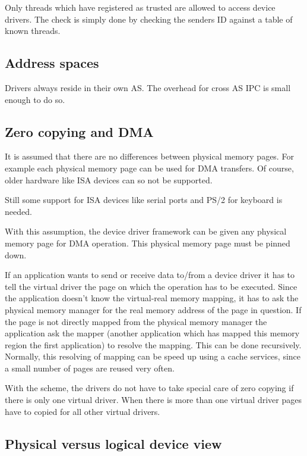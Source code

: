 Only threads which have registered as trusted are allowed to access
device drivers.  The check is simply done by checking the senders
ID against a table of known threads.

\subsection{Address spaces}

Drivers always reside in their own AS. The overhead for cross AS IPC
is small enough to do so.

\subsection{Zero copying and DMA}

It is assumed that there are no differences between physical memory
pages. For example each physical memory page can be used for DMA
transfers. Of course, older hardware like ISA devices can so not be
supported.  

Still some support for ISA devices like serial ports and PS/2 for
keyboard is needed.  
  
With this assumption, the device driver framework can be given any
physical memory page for DMA operation.  This physical memory page
must be pinned down.
  
If an application wants to send or receive data to/from a device
driver it has to tell the virtual driver the page on which the
operation has to be executed.  Since the application doesn't know
the virtual-real memory mapping, it has to ask the physical memory
manager for the real memory address of the page in question.  If the
page is not directly mapped from the physical memory manager the
application ask the mapper (another application which has mapped
this memory region the first application) to resolve the mapping.
This can be done recursively.  Normally, this resolving of mapping
can be speed up using a cache services, since a small number of
pages are reused very often.
  
With the scheme, the drivers do not have to take special care of
zero copying if there is only one virtual driver.  When there is
more than one virtual driver pages have to copied for all other
virtual drivers.

\subsection{Physical versus logical device view}

